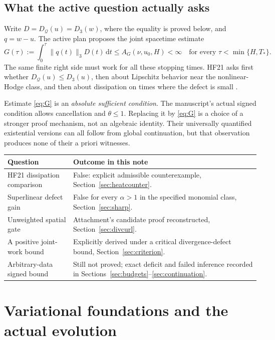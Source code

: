 \documentclass[11pt,a4paper]{article}
\theoremstyle{definition}
\theoremstyle{remark}
\newcommand{\Q}{\mathcal Q}
\newcommand{\dd}{\,\mathrm d}
\newcommand{\norm}[1]{\lVert #1\rVert}
\numberwithin{equation}{section}
\begin{document}
\subsection{What the active question actually asks}
Write \(D=D_{\Q}(u)=D_3(w)\), where the equality is proved below, and \(q=w-u\). The active plan proposes the joint spacetime estimate
\begin{equation}\label{eq:G}
G(\tau):=\int_0^\tau\norm{q(t)}_3D(t)\dd t
\le A_G(\nu,u_0,H)<\infty
\quad\text{for every }\tau<\min\{H,T_*\}.
\end{equation}
The same finite right side must work for all these stopping times. HF21 asks first whether \(D_{\Q}(u)\le D_3(u)\), then about Lipschitz behavior near the nonlinear-Hodge class, and then about dissipation on times where the defect is small \cite{Research}.

Estimate \eqref{eq:G} is an \emph{absolute sufficient condition}. The manuscript's actual signed condition allows cancellation and \(\theta\le1\). Replacing it by \eqref{eq:G} is a choice of a stronger proof mechanism, not an algebraic identity. Their universally quantified existential versions can all follow from global continuation, but that observation produces none of their a priori witnesses.

\begin{center}
\begin{tabular}{@{}p{54mm}p{101mm}@{}}
\toprule
Question & Outcome in this note\\
\midrule
HF21 dissipation comparison & False: explicit admissible counterexample, Section~\ref{sec:heatcounter}.\\
Superlinear defect gain & False for every \(\alpha>1\) in the specified monomial class, Section~\ref{sec:sharp}.\\
Unweighted spatial gate & Attachment's candidate proof reconstructed, Section~\ref{sec:divcurl}.\\
A positive joint-work bound & Explicitly derived under a critical divergence-defect bound, Section~\ref{sec:criterion}.\\
Arbitrary-data signed bound & Still not proved; exact deficit and failed inference recorded in Sections~\ref{sec:budgets}--\ref{sec:continuation}.\\
\bottomrule
\end{tabular}
\end{center}

\section{Variational foundations and the actual evolution}\label{sec:variational}
\end{document}
